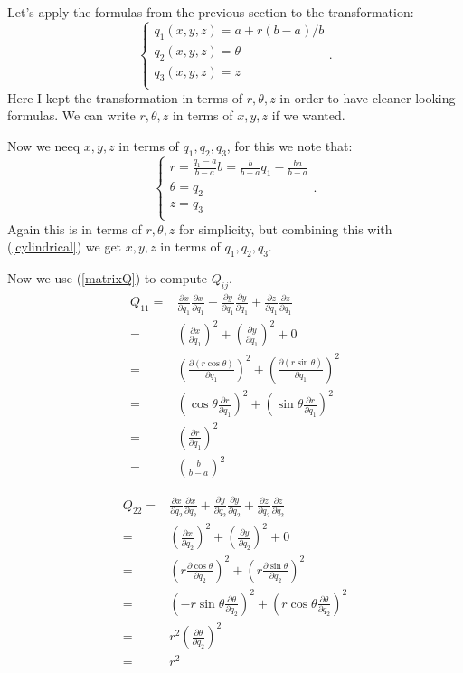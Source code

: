 \documentclass{amsart}
\begin{document}
Let's apply the formulas from the previous section to the transformation:
\[\begin{cases}
  q_1(x,y,z)=a+r(b-a)/b\\
  q_2(x,y,z)=\theta\\
q_3(x,y,z)=z\\
\end{cases}.\]
Here I kept the transformation in terms of $r,\theta,z$ in order to have cleaner looking formulas.
We can write $r,\theta,z$ in terms of $x,y,z$ if we wanted.

Now we neeq $x,y,z$ in terms of $q_1,q_2,q_3$, for this we note that:
\[\begin{cases}
r=\frac{q_1-a}{b-a}b=\frac{b}{b-a}q_1-\frac{ba}{b-a}\\
\theta=q_2\\
z=q_3\\
\end{cases}.\]
Again this is in terms of $r,\theta,z$ for simplicity, but combining this with (\ref{cylindrical})
we get $x,y,z$ in terms of $q_1,q_2,q_3$.

Now we use (\ref{matrixQ}) to compute $Q_{ij}$.
\begin{align*}
Q_{11}
=&\frac{\partial x}{\partial q_1}\frac{\partial x}{\partial q_1}
+\frac{\partial y}{\partial q_1}\frac{\partial y}{\partial q_1}
+\frac{\partial z}{\partial q_1}\frac{\partial z}{\partial q_1}\\
=&\left(\frac{\partial x}{\partial q_1}\right)^2+\left(\frac{\partial y}{\partial q_1}\right)^2+0\\
=&\left(\frac{\partial (r\cos\theta)}{\partial q_1}\right)^2+\left(\frac{\partial (r\sin\theta)}{\partial q_1}\right)^2\\
=&\left(\cos\theta\frac{\partial r}{\partial q_1}\right)^2+\left(\sin\theta\frac{\partial r}{\partial q_1}\right)^2\\
=&\left(\frac{\partial r}{\partial q_1}\right)^2\\
=&\left(\frac{b}{b-a}\right)^2
\end{align*}

\begin{align*}
Q_{22}
=&\frac{\partial x}{\partial q_2}\frac{\partial x}{\partial q_2}
+\frac{\partial y}{\partial q_2}\frac{\partial y}{\partial q_2}
+\frac{\partial z}{\partial q_2}\frac{\partial z}{\partial q_2}\\
=&\left(\frac{\partial x}{\partial q_2}\right)^2+\left(\frac{\partial y}{\partial q_2}\right)^2+0\\
=&\left(r\frac{\partial \cos\theta}{\partial q_2}\right)^2+\left(r\frac{\partial \sin\theta}{\partial q_2}\right)^2\\
=&\left(-r\sin\theta\frac{\partial \theta}{\partial q_2}\right)^2+\left(r\cos\theta\frac{\partial \theta}{\partial q_2}\right)^2\\
=&r^2\left(\frac{\partial \theta}{\partial q_2}\right)^2\\
=&r^2
\end{align*}
\end{document}
